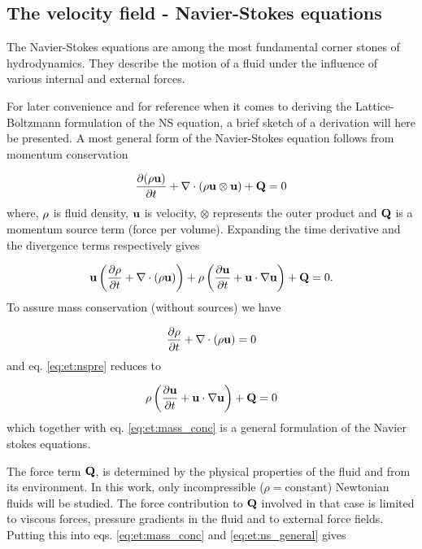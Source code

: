 \subsection{The velocity field - Navier-Stokes equations}\label{sec:et:ns}
The Navier-Stokes equations are among the most fundamental corner
stones of hydrodynamics. They describe the motion of a fluid under
the influence of various internal and external forces.

For later convenience and for reference when it comes to deriving the
Lattice-Boltzmann formulation of the NS equation, a brief sketch of a
derivation will here be presented. A most general form of the
Navier-Stokes equation follows from momentum conservation

\begin{equation}
\dfrac{\partial (\mathrm{\rho} \mathbf{u})}{\partial t} + \nabla \cdot (\rho \mathbf{u}
\otimes \mathbf{u}) + \mathbf{Q} = 0 
\end{equation}
where, $\mathrm{\rho}$ is fluid density, $\mathbf{u}$ is velocity, $\otimes$
represents the outer product and $\mathbf{Q}$ is a momentum source term
(force per volume). Expanding the time derivative and the divergence
terms respectively gives
 
\begin{equation}\label{eq:et:nspre}
\mathbf{u} \left ( \dfrac{\partial \mathrm{\rho}}{\partial t} + \nabla \cdot
  (\mathrm{\rho} \mathbf{u}) \right ) + \mathrm{\rho} \left (\dfrac{\partial \mathbf{u}}{\partial t} +
  \mathbf{u} \cdot \nabla \mathbf{u} 
  \right ) + \mathbf{Q} = 0.
\end{equation}
To assure mass conservation (without sources) we have

\begin{equation}\label{eq:et:mass_conc}
 \dfrac{\partial \mathrm{\rho}}{\partial t} + \nabla \cdot(
  \mathrm{\rho} \mathbf{u}) = 0
\end{equation}
and eq. \eqref{eq:et:nspre} reduces to

\begin{equation}\label{eq:et:ns_general} 
\mathrm{\rho} \left (\dfrac{\partial \mathbf{u}}{\partial t} +
  \mathbf{u} \cdot \nabla \mathbf{u} 
  \right ) + \mathbf{Q} = 0
\end{equation}
which together with eq. \eqref{eq:et:mass_conc} is a general
formulation of the Navier stokes equations. 

The force term $\mathbf{Q}$, is determined by the physical properties of the
fluid and from its environment. In this work, only incompressible
($\rho = \mbox{constant}$) Newtonian fluids will be studied. The force
contribution to $\mathbf{Q}$ involved in that case is limited to viscous
forces, pressure gradients in the fluid and to external force
fields. Putting this into eqs. \eqref{eq:et:mass_conc} and
\eqref{eq:et:ns_general} gives

